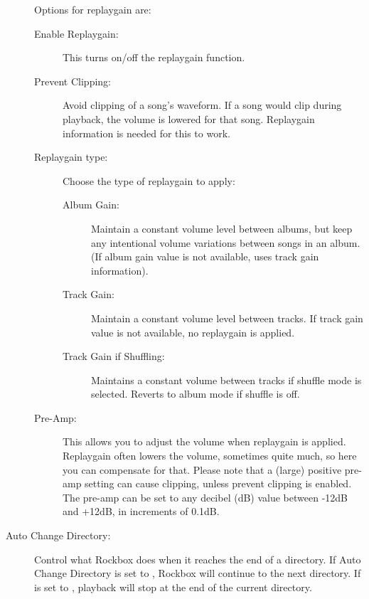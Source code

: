 \begin{description}
{{      Options for replaygain are:
      \begin{description}
      \item[Enable Replaygain: ]This turns on/off the replaygain function.
      \item[Prevent Clipping: ]Avoid clipping of a song's waveform.
        If a song would clip during playback, the volume is lowered for 
        that song. Replaygain information is needed for this to work.
      \item[Replaygain type: ]Choose the type of replaygain to apply:
        \begin{description}
        \item[Album Gain: ]Maintain a constant volume level between 
          albums, but keep any intentional volume variations between 
          songs in an album. (If album gain value is not available,
          uses track gain information).
        \item[Track Gain: ]Maintain a constant volume level between 
          tracks. If track gain value is not available, no replaygain 
          is applied.
        \item[Track Gain if Shuffling: ]Maintains a constant volume 
          between tracks if shuffle mode is selected. Reverts to album
          mode if shuffle is off.
        \end{description}
      \item[Pre-Amp: ]This allows you to adjust the volume when replaygain
        is applied. Replaygain often lowers the volume, sometimes quite
        much, so here you can compensate for that. Please note that a 
        (large) positive pre-amp setting can cause clipping, unless 
        prevent clipping is enabled.  The pre-amp can be set to any 
        decibel (dB) value between -12dB and +12dB, in increments of 0.1{}dB.
      \end{description}
    }
  }
\item[Auto Change Directory: ]Control what Rockbox does when it reaches the end
  of a directory. If Auto Change Directory is set to , Rockbox 
  will continue to the next directory. If  is 
  set to , playback will stop at the end of the current directory.
\end{description}
